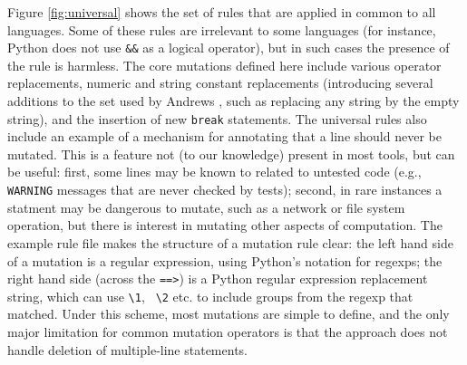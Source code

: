 Figure \ref{fig:universal} shows the set of rules that are applied in
common to all languages.  Some of these rules are irrelevant to some
languages (for instance, Python does not use {\tt \&\&} as a logical
operator), but in such cases the presence of the rule is harmless.  The
core mutations defined here include various operator replacements,
numeric and string constant replacements (introducing several
additions to the set used by Andrews \cite{mutant}, such as replacing
any string by the empty string), and the insertion of new {\tt break}
statements.  The universal rules also include an example of a
mechanism for annotating that a line should never be mutated.  This is
a feature not (to our knowledge) present in most tools, but can be
useful:  first, some lines may be known to related to untested code
(e.g., {\tt WARNING} messages that are never checked by tests);
second, in rare instances a statment may be dangerous to mutate, such
as a network or file system operation, but there is interest in
mutating other aspects of computation.  The example rule file makes
the structure of a mutation rule clear:  the left hand side of a
mutation is a regular expression, using Python's notation for regexps;
the right hand side (across the {\tt ==>}) is a Python regular
expression replacement string, which can use {\tt \textbackslash 1}, {\tt
  \textbackslash 2}
etc. to include groups from the regexp that matched.  Under this
scheme, most mutations are simple to define, and the only major
limitation for common mutation operators is that the approach does not
handle deletion of multiple-line statements.

